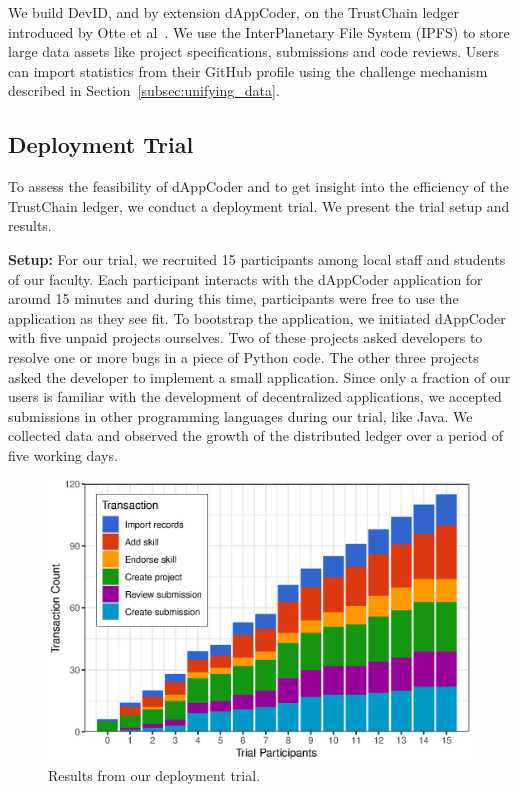 We build DevID, and by extension dAppCoder, on the TrustChain ledger introduced by Otte et al~\cite{otte2017trustchain}.
We use the InterPlanetary File System (IPFS) to store large data assets like project specifications, submissions and code reviews.
Users can import statistics from their GitHub profile using the challenge mechanism described in Section~\ref{subsec:unifying_data}.

\subsection{Deployment Trial}
To assess the feasibility of dAppCoder and to get insight into the efficiency of the TrustChain ledger, we conduct a deployment trial.
We present the trial setup and results.

\textbf{Setup:}
For our trial, we recruited 15 participants among local staff and students of our faculty.
Each participant interacts with the dAppCoder application for around 15 minutes and during this time, participants were free to use the application as they see fit.
To bootstrap the application, we initiated dAppCoder with five unpaid projects ourselves.
Two of these projects asked developers to resolve one or more bugs in a piece of Python code.
The other three projects asked the developer to implement a small application.
Since only a fraction of our users is familiar with the development of decentralized applications, we accepted submissions in other programming languages during our trial, like Java.
We collected data and observed the growth of the distributed ledger over a period of five working days.


\begin{figure}[t!]
	\centering
	\includegraphics[width=.75\columnwidth]{devid/resources/experiment/experiment_1_unit.eps}
	\caption{Results from our deployment trial.}
	\label{fig:experiment_graph}
\end{figure}

